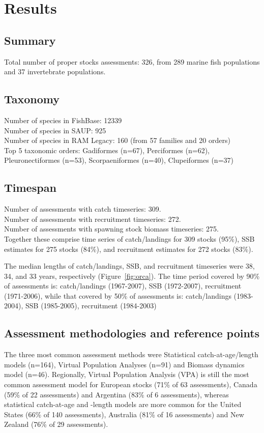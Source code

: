 \section*{Results}
\subsection*{Summary}
\noindent
Total number of proper stocks assessments: 326, from 289 marine fish populations and 37
invertebrate populations.

\subsection*{Taxonomy}
\noindent

Number of species in FishBase: 12339\\
Number of species in SAUP: 925\\
Number of species in RAM Legacy: 160 (from 57 families and 20 orders) \\
Top 5 taxonomic orders: Gadiformes (n=67), Perciformes (n=62), Pleuronectiformes (n=53), Scorpaeniformes (n=40), Clupeiformes (n=37) \\

\subsection*{Timespan}
\noindent
Number of assessments with catch timeseries: 309.\\
Number of assessments with recruitment timeseries: 272.\\
Number of assessments with spawning stock biomass timeseries: 275.\\

Together these comprise time series of
catch/landings for 309 stocks (95\%),
SSB estimates for 275 stocks (84\%), and recruitment estimates for
272 stocks (83\%).

The median lengths of catch/landings, SSB, and recruitment timeseries
were 38, 34, and 33
years, respectively (Figure~\ref{fig:orca}).  The time period covered by 90\% of assessments
is: catch/landings (1967-2007), SSB
(1972-2007), recruitment (1971-2006), while that
covered by 50\% of assessments is: catch/landings
(1983-2004), SSB (1985-2005), recruitment
(1984-2003)
 
\subsection*{Assessment methodologies and reference points}
\noindent
The three most common assessment methods were
Statistical catch-at-age/length models (n=164), Virtual Population Analyses (n=91) and
Biomass dynamics model (n=46). Regionally, Virtual Population Analysis
(VPA) is still the most common assessment model for European stocks
(71\% of 63 assessments),
Canada (59\% of 22
assessments) and Argentina (83\% of
6 assessments), whereas statistical catch-at-age
and -length models are more common for the United States
(66\% of 140 assessments),
Australia (81\% of 16
assessments) and New Zealand (76\% of
29 assessments).

